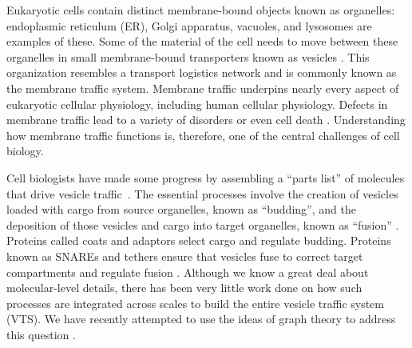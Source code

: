 \noindent 
Eukaryotic cells contain distinct membrane-bound objects known as organelles: endoplasmic reticulum (ER), Golgi apparatus, vacuoles, and lysosomes are examples of these.
%
%
%
%
%
%
Some of the material of the cell needs to move
between these organelles in small membrane-bound
transporters known as vesicles \cite{stenmark2009rab}.
%
This organization resembles a transport logistics network
and is commonly known as the membrane traffic system.
%
Membrane traffic underpins nearly every aspect of eukaryotic cellular
physiology, including human cellular physiology.
%
Defects in membrane traffic lead to a variety of disorders or even
cell death \cite{stenmark2009rab}.
%
Understanding how membrane traffic functions is, therefore, one of the
central challenges of cell biology.
%

Cell biologists have made some progress by assembling a
``parts list” of molecules that drive vesicle
traffic~\cite{dacks2007evolution}.
%
The essential processes involve the creation of vesicles loaded with
cargo from source organelles, known as ``budding”, and the deposition
of those vesicles and cargo into target organelles, known as ``fusion”
\cite{munro2004organelle}.
%
Proteins called coats and adaptors select cargo and regulate budding.
%
Proteins known as SNAREs and tethers ensure that vesicles
fuse to correct target compartments and regulate fusion
\cite{mani2016stacking}.
%
Although we know a great deal about molecular-level details, there has
been very little work done on how such processes are integrated across
scales to build the entire vesicle traffic system (VTS).
%
We have recently attempted to use the ideas of graph theory to address
this question \cite{mani2016stacking,shukla2017discovering}.

